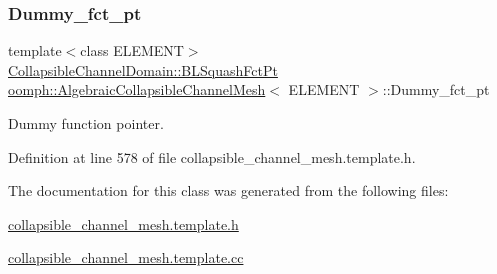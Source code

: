 \subsubsection{\texorpdfstring{Dummy\+\_\+fct\+\_\+pt}{Dummy\_fct\_pt}}
{\footnotesize\ttfamily template$<$class E\+L\+E\+M\+E\+NT$>$ \\
\hyperlink{classoomph_1_1CollapsibleChannelDomain_a2bf1d7943bfac134a5c27a54c7e1faed}{Collapsible\+Channel\+Domain\+::\+B\+L\+Squash\+Fct\+Pt} \hyperlink{classoomph_1_1AlgebraicCollapsibleChannelMesh}{oomph\+::\+Algebraic\+Collapsible\+Channel\+Mesh}$<$ E\+L\+E\+M\+E\+NT $>$\+::Dummy\+\_\+fct\+\_\+pt\hspace{0.3cm}{\ttfamily [protected]}}



Dummy function pointer. 



Definition at line 578 of file collapsible\+\_\+channel\+\_\+mesh.\+template.\+h.



The documentation for this class was generated from the following files\+:\begin{DoxyCompactItemize}
\item 
\hyperlink{collapsible__channel__mesh_8template_8h}{collapsible\+\_\+channel\+\_\+mesh.\+template.\+h}\item 
\hyperlink{collapsible__channel__mesh_8template_8cc}{collapsible\+\_\+channel\+\_\+mesh.\+template.\+cc}\end{DoxyCompactItemize}
